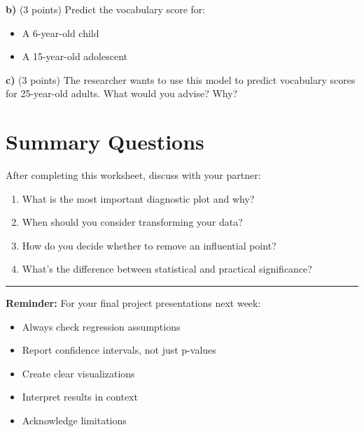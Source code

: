 \documentclass[11pt]{article}
\begin{document}
\vspace{3cm}

\textbf{b)} (3 points) Predict the vocabulary score for:
\begin{itemize}
\item A 6-year-old child
\item A 15-year-old adolescent
\end{itemize}

\vspace{3cm}

\textbf{c)} (3 points) The researcher wants to use this model to predict vocabulary scores for 25-year-old adults. What would you advise? Why?

\vspace{3cm}

\section*{Summary Questions}

After completing this worksheet, discuss with your partner:

\begin{enumerate}
\item What is the most important diagnostic plot and why?
\item When should you consider transforming your data?
\item How do you decide whether to remove an influential point?
\item What's the difference between statistical and practical significance?
\end{enumerate}

\vspace{0.5cm}

\hrule

\vspace{0.3cm}

\textbf{Reminder:} For your final project presentations next week:
\begin{itemize}
\item Always check regression assumptions
\item Report confidence intervals, not just p-values
\item Create clear visualizations
\item Interpret results in context
\item Acknowledge limitations
\end{itemize}
\end{document}
